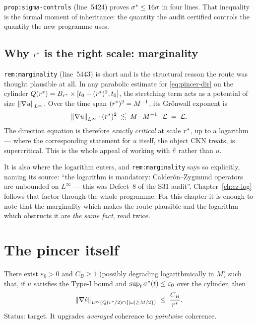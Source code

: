 \texttt{prop:sigma-controls} (line~5424) proves \(\sigma^{*}\le16\sigma\) in four
lines. That inequality is the formal moment of inheritance: the quantity the
audit certified controls the quantity the new programme uses.

\subsection{\texorpdfstring{Why \(r^{*}\) is the right scale: marginality}{Why r-star is the right scale: marginality}}

\texttt{rem:marginality} (line~5443) is short and is the structural reason the
route was thought plausible at all. In any parabolic estimate for
\eqref{eq:pincer-dir} on the cylinder
\(Q(r^{*})=B_{r^{*}}\times[t_0-(r^{*})^2,t_0]\), the stretching term acts as
a potential of size \(\left\|\nabla u\right\|_{L^\infty}\). Over the time span
\((r^{*})^2=M^{-1}\), its Gr\"onwall exponent is
\[
  \left\|\nabla u\right\|_{L^\infty}\cdot(r^{*})^2
  \;\lesssim\; M\cdot M^{-1}\cdot\mathcal{L} \;=\; \mathcal{L} .
\]
The direction equation is therefore \emph{exactly critical} at scale
\(r^{*}\), up to a logarithm --- where the corresponding statement for \(u\)
itself, the object CKN treats, is supercritical. This is the whole appeal of
working with \(\hat{e}\) rather than \(u\).

It is also where the logarithm enters, and \texttt{rem:marginality} says so
explicitly, naming its source: ``the logarithm is mandatory:
Calder\'on--Zygmund operators are unbounded on \(L^\infty\) --- this was
Defect~8 of the S31 audit''. Chapter~\ref{ch:cz-log} follows that factor
through the whole programme. For this chapter it is enough to note that the
marginality which makes the route plausible and the logarithm which obstructs
it are \emph{the same fact}, read twice.

\section{The pincer itself}
\label{sec:pincer-statement}

\begin{statement}
\label{st:h1}
There exist \(\varepsilon_0>0\) and \(C_B\ge1\) (possibly degrading
logarithmically in \(M\)) such that, if \(u\) satisfies the Type-I bound and
\(\sup_{t}\sigma^{*}(t)\le\varepsilon_0\) over the cylinder, then
\[
  \left\|\nabla\hat{e}\right\|_{L^\infty\left(Q(r^{*}/2)\cap\{\left|\omega\right|\ge M/2\}\right)}
  \;\le\; \frac{C_B}{r^{*}}.
\]
Status: \OPEN{} target. It upgrades \emph{averaged} coherence to
\emph{pointwise} coherence.
\end{statement}

